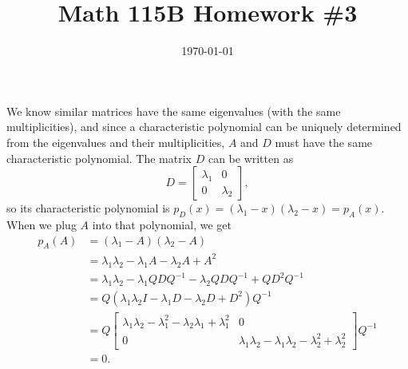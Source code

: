 \documentclass{article}
\date{\today}
\title{Math 115B Homework \#3}
\begin{document}
\maketitle

\begin{prob}
\end{prob}
We know similar matrices have the same eigenvalues (with the same multiplicities), and since a characteristic polynomial can be uniquely determined from the eigenvalues and their multiplicities, $A$ and $D$ must have the same characteristic polynomial. The matrix $D$ can be written as
\[ D = \begin{bmatrix}
    \lambda_1 & 0 \\
    0 & \lambda_2
\end{bmatrix}, \]
so its characteristic polynomial is $p_D(x) = (\lambda_1 - x)(\lambda_2 - x) = p_A(x)$. When we plug $A$ into that polynomial, we get
\begin{align*}
    p_A(A) &= (\lambda_1 - A)(\lambda_2 - A) \\
           &= \lambda_1 \lambda_2 - \lambda_1 A - \lambda_2 A + A^2 \\
           &= \lambda_1 \lambda_2 - \lambda_1 QDQ^{-1} - \lambda_2 QDQ^{-1} + QD^2Q^{-1} \\
           &= Q \left( \lambda_1 \lambda_2 I - \lambda_1 D - \lambda_2 D + D^2 \right) Q^{-1} \\
           &= Q \begin{bmatrix}
               \lambda_1 \lambda_2 - \lambda_1^2 - \lambda_2 \lambda_1 + \lambda_1^2 & 0 \\
               0 & \lambda_1 \lambda_2 - \lambda_1 \lambda_2 - \lambda_2^2 + \lambda_2^2
           \end{bmatrix} Q^{-1} \\
           &= 0.
\end{align*}
\end{document}
